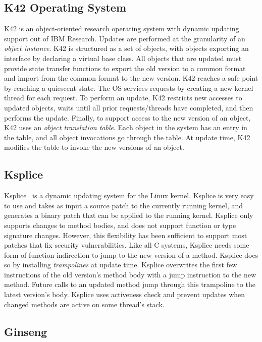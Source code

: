 \subsection{K42 Operating System}

K42 is an object-oriented research operating system with dynamic updating
support out of IBM Research. Updates are performed at the granularity of an
{\em object instance}. K42 is structured as a set of objects, with objects
exporting an interface by declaring a virtual base class. All objects that
are updated must provide state transfer functions to export the old version
to a common format and import from the common format to the new version.
K42 reaches a safe point by reaching a quiescent state. The OS services
requests by creating a new kernel thread for each request. To perform an
update, K42 restricts new accesses to updated objects, waits until all prior
requests/threads have completed, and then performs the update. Finally, to
support access to the new version of an object, K42 uses an {\em object
translation table}. Each object in the system has an entry in the table,
and all object invocations go through the table. At update time, K42
modifies the table to invoke the new versions of an object.

\subsection{Ksplice}

Ksplice~\cite{ksplice} is a dynamic updating system for the Linux kernel.
Ksplice is very easy to use and takes as input a source patch to the
currently running kernel, and generates a binary patch that can be applied
to the running kernel. Ksplice only supports changes to method bodies, and
does not support function or type signature changes. However, this
flexibility has been sufficient to support most patches that fix security
vulnerabilities. Like all C systems, Ksplice needs some form of function
indirection to jump to the new version of a method. Ksplice does so by
installing {\em trampolines} at update time. Ksplice overwrites the first
few instructions of the old version's method body with a jump instruction
to the new method. Future calls to an updated method jump through this
trampoline to the latest version's body.  Ksplice uses activeness check and
prevent updates when changed methods are active on some thread's stack.

\subsection{Ginseng}

